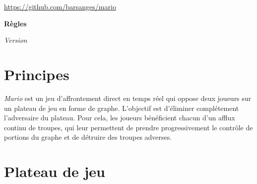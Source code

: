 \documentclass[a4paper,11pt,headings=normal]{scrartcl}
\theoremstyle{mythm}
\begin{document}
\begin{flushleft}
{\small \sffamily \url{https://github.com/barsanges/mario}}\vspace{0.8em}

{\raggedleft \bfseries\LARGE Règles}\vspace{0.8em}

{\itshape Version }
\end{flushleft}

\section{Principes}

\emph{Mario} est un jeu d'affrontement direct en temps réel qui oppose
deux joueurs sur un plateau de jeu en forme de graphe. L'objectif est
d'éliminer complétement l'adversaire du plateau. Pour cela, les
joueurs bénéficient chacun d'un afflux continu de troupes, qui leur
permettent de prendre progressivement le contrôle de portions du
graphe et de détruire des troupes adverses.

\section{Plateau de jeu}
\end{document}
